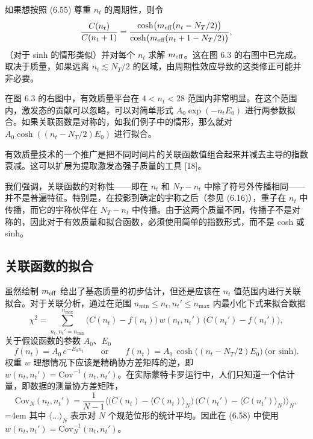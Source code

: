 如果想按照 (6.55) 尊重 $n_t$ 的周期性，则令
\begin{equation}
  \frac{C(n_t)}{C(n_t + 1)}
  = \frac{\cosh\!\big( m_{\rm eff}(n_t - N_T/2) \big)}
         {\cosh\!\big( m_{\rm eff}(n_t + 1 - N_T/2) \big)} ,
\end{equation}
（对于 sinh 的情形类似）并对每个 $n_t$ 求解 $m_{\rm eff}$。这在图 6.3 的右图中已完成。取决于质量，如果远离 $n_t \lesssim N_T/2$ 的区域，由周期性效应导致的这类修正可能并非必要。

在图 6.3 的右图中，有效质量平台在 $4 < n_t < 28$ 范围内非常明显。在这个范围内，激发态的贡献可以忽略，可以对简单形式 $A_0 \exp(-n_t E_0)$ 进行两参数拟合。如果关联函数是对称的，如我们例子中的情形，那么就对 $A_0 \cosh((n_t - N_T/2) E_0)$ 进行拟合。

有效质量技术的一个推广是把不同时间片的关联函数值组合起来并减去主导的指数衰减。这可以扩展为提取激发态强子质量的工具 [18]。

我们强调，关联函数的对称性——即在 $n_t$ 和 $N_T - n_t$ 中除了符号外传播相同——并不是普遍特征。特别是，在投影到确定的宇称之后（参见 (6.16)），重子在 $n_t$ 中传播，而它的宇称伙伴在 $N_T - n_t$ 中传播。由于这两个质量不同，传播子不是对称的，因此对于有效质量和拟合函数，必须使用简单的指数形式，而不是 cosh 或 sinh。

\subsection{关联函数的拟合}

虽然绘制 $m_{\rm eff}$ 给出了基态质量的初步估计，但还是应该在 $n_t$ 值范围内进行关联拟合。对于关联分析，通过在范围 $n_{\min} \leq n_t, n_t' \leq n_{\max}$ 内最小化下式来拟合数据
\begin{equation}
  \chi^2 = \sum_{n_t, n_t' = n_{\min}}^{n_{\max}}
    \big( C(n_t) - f(n_t) \big)\, w(n_t, n_t')\,
    \big( C(n_t') - f(n_t') \big) ,
\end{equation}
关于假设函数的参数 $A_0$、$E_0$
\begin{equation}
  f(n_t) = A_0\, e^{-E_0 n_t} \qquad \text{or} \qquad
  f(n_t) = A_0\, \cosh\!\big( (n_t - N_T/2) E_0 \big) \ \text{(or sinh)} .
\end{equation}
权重 $w$ 理想情况下应该是精确协方差矩阵的逆，即 $w(n_t, n_t') = \mathrm{Cov}^{-1}(n_t, n_t')$。在实际蒙特卡罗运行中，人们只知道一个估计量，即数据的测量协方差矩阵，
\begin{equation}
  \mathrm{Cov}_N(n_t, n_t')
  = \frac{1}{N - 1}\Big\langle
      \big( C(n_t) - \langle C(n_t)\rangle_N \big)\,
      \big( C(n_t') - \langle C(n_t')\rangle_N \big)
    \Big\rangle_N ,
\end{equation}
\begingroup\emergencystretch=4em 其中 $\langle\ldots\rangle_N$ 表示对 $N$ 个规范位形的统计平均。因此在 (6.58) 中使用\linebreak[0] $w(n_t, n_t') = \mathrm{Cov}^{-1}_N(n_t, n_t')$。\par\endgroup

